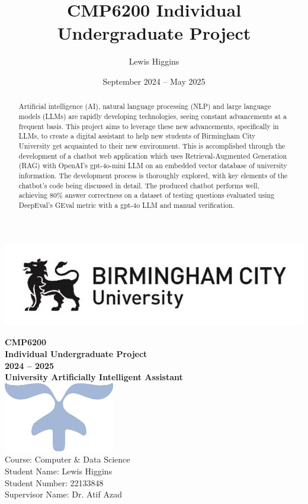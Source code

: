 \documentclass[12pt]{report}
\title{CMP6200 Individual Undergraduate Project}
\author{Lewis Higgins}
\date{September 2024 – May 2025}
\begin{document}
\makeatletter
\begin{titlepage}
    \includegraphics[width=0.3\linewidth]{BCUWide.jpg}\\[4ex]
    \vspace{1cm}
    \begin{center}
        {\huge \bfseries  CMP6200}\\[2ex]
        {\huge \bfseries  Individual Undergraduate Project}\\[2ex]
        {\huge \bfseries 2024 – 2025}\\[16ex]
        {\huge \bfseries University Artificially Intelligent Assistant}\\[6ex]
        \includegraphics[width=0.1\linewidth]{Symbol.png}\\[40ex]
        Course: Computer \& Data Science\\
        Student Name: Lewis Higgins\\
        Student Number: 22133848\\
        Supervisor Name: Dr. Atif Azad
    \end{center}
\end{titlepage}
\makeatother
\thispagestyle{empty}
\newpage



\begin{abstract}
    Artificial intelligence (AI), natural language processing (NLP) and large language models (LLMs) are
    rapidly developing technologies, seeing constant advancements at a frequent basis.
    This project aims to leverage these new advancements, specifically in LLMs, to create a digital assistant 
    to help new students of Birmingham City University get acquainted to their new environment. This is accomplished 
    through the development of a chatbot web application which uses Retrieval-Augmented Generation (RAG) with 
    OpenAI's gpt-4o-mini LLM on an embedded vector database of university information. The development process 
    is thoroughly explored, with key elements of the chatbot's code being discussed in detail.
    The produced chatbot performs well, achieving 80\% answer correctness on a dataset of testing questions
    evaluated using DeepEval's GEval metric with a gpt-4o LLM and manual verification.
\end{abstract}
\end{document}

